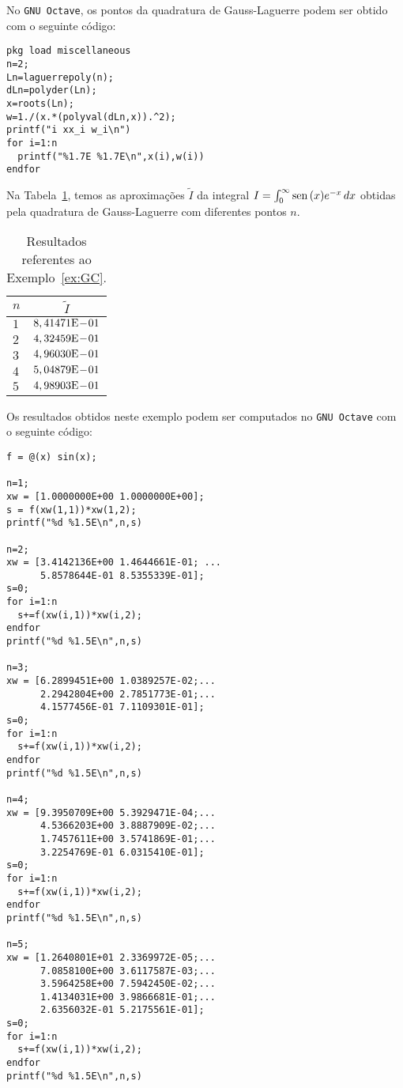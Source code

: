 \ifisoctave
No \verb+GNU Octave+, os pontos da quadratura de Gauss-Laguerre podem ser obtido com o seguinte código:
\begin{verbatim}
pkg load miscellaneous
n=2;
Ln=laguerrepoly(n);
dLn=polyder(Ln);
x=roots(Ln);
w=1./(x.*(polyval(dLn,x)).^2);
printf("i xx_i w_i\n")
for i=1:n
  printf("%1.7E %1.7E\n",x(i),w(i))
endfor
\end{verbatim}
\fi

\begin{ex}\label{ex:GLa}
  Na Tabela~\ref{tab:ex_GLa}, temos as aproximações $\tilde{I}$ da integral $I = \int_0^\infty \operatorname{sen}\,(x)e^{-x}\,dx$ obtidas pela quadratura de Gauss-Laguerre com diferentes pontos $n$.

\begin{table}[h!]
  \centering
  \begin{tabular}{lc}
    $n$ & $\tilde{I}$\\\hline
    $1$ & $8,41471\mathrm{E}\!-\!01$ \\
    $2$ & $4,32459\mathrm{E}\!-\!01$ \\
    $3$ & $4,96030\mathrm{E}\!-\!01$ \\
    $4$ & $5,04879\mathrm{E}\!-\!01$ \\
    $5$ & $4,98903\mathrm{E}\!-\!01$ \\\hline
  \end{tabular}
  \caption{Resultados referentes ao Exemplo~\ref{ex:GC}.}
  \label{tab:ex_GLa}
\end{table}

\ifisoctave
Os resultados obtidos neste exemplo podem ser computados no \verb+GNU Octave+ com o seguinte código:
\begin{verbatim}
f = @(x) sin(x);

n=1;
xw = [1.0000000E+00 1.0000000E+00];
s = f(xw(1,1))*xw(1,2);
printf("%d %1.5E\n",n,s)

n=2;
xw = [3.4142136E+00 1.4644661E-01; ...
      5.8578644E-01 8.5355339E-01];
s=0;
for i=1:n
  s+=f(xw(i,1))*xw(i,2);
endfor
printf("%d %1.5E\n",n,s)

n=3;
xw = [6.2899451E+00 1.0389257E-02;...
      2.2942804E+00 2.7851773E-01;...
      4.1577456E-01 7.1109301E-01];
s=0;
for i=1:n
  s+=f(xw(i,1))*xw(i,2);
endfor
printf("%d %1.5E\n",n,s)

n=4;
xw = [9.3950709E+00 5.3929471E-04;...
      4.5366203E+00 3.8887909E-02;...
      1.7457611E+00 3.5741869E-01;...
      3.2254769E-01 6.0315410E-01];
s=0;
for i=1:n
  s+=f(xw(i,1))*xw(i,2);
endfor
printf("%d %1.5E\n",n,s)

n=5;
xw = [1.2640801E+01 2.3369972E-05;...
      7.0858100E+00 3.6117587E-03;...
      3.5964258E+00 7.5942450E-02;...
      1.4134031E+00 3.9866681E-01;...
      2.6356032E-01 5.2175561E-01];
s=0;
for i=1:n
  s+=f(xw(i,1))*xw(i,2);
endfor
printf("%d %1.5E\n",n,s)
\end{verbatim}
\fi
\end{ex}

